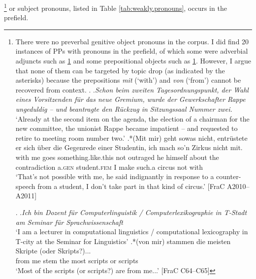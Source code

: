 \footnote{There were no preverbal genitive  object pronouns in the corpus. 
I did find 20 instances of PPs with pronouns in the prefield, of which some were adverbial adjuncts such as \ref{ex:frac.adv} and some prepositional objects  such as \ref{ex:frac.pobject}.
However, I argue that none of them can be targeted by topic drop (as indicated by the asterisks) because the prepositions \textit{mit} (`with') and \textit{von} (`from') cannot be recovered from context.
\ex.\label{ex:frac.adv}
\a.\textit{Schon beim zweiten Tagesordnungspunkt, der Wahl eines Vorsitzenden für das neue Gremium, wurde der Gewerkschafter Rappe ungeduldig -- und beantragte den Rückzug in Sitzungssaal Nummer zwei.}\\
`Already at the second item on the agenda, the election of a chairman for the new committee, the unionist Rappe became impatient -- and requested to retire to meeting room number two.'
\bg.*(Mit mir) geht sowas nicht, entrüstete er sich über die Gegenrede einer Studentin, ich mach so'n Zirkus nicht mit.\\
with me goes something.like.this not outraged he himself about the contradiction a.\textsc{gen} student.\textsc{fem} I make such.a circus not with\\
`That's not possible with me, he said indignantly in response to a counter-speech from a student, I don't take part in that kind of circus.' [FraC A2010--A2011]

\ex.\label{ex:frac.pobject}
\a.\textit{Ich bin Dozent für Computerlinguistik / Computerlexikographie in T-Stadt am Seminar für Sprachwissenschaft}\\
`I am a lecturer in computational linguistics / computational lexicography in T-city at the Seminar for Linguistics'
\bg.*(von mir) stammen die meisten Skripte (oder Skripts?)...\\
from me stem the most scripts or scripts\\
`Most of the scripts (or scripts?) are from me...' [FraC C64--C65]

}%
 or subject pronouns, listed in Table \ref{tab:weakly.pronouns}, occurs in the prefield.

